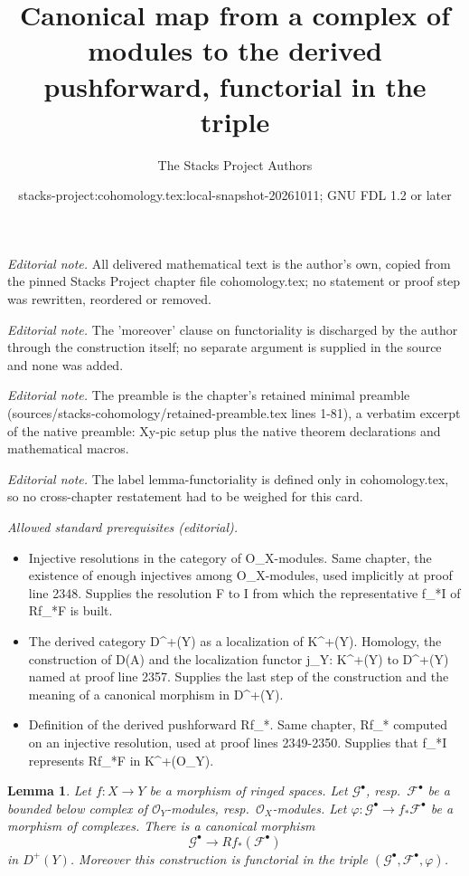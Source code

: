\documentclass[10pt,a4paper]{amsart}
\title{Canonical map from a complex of modules to the derived pushforward, functorial in the triple}
\author{The Stacks Project Authors}
\date{stacks-project:cohomology.tex:local-snapshot-20261011; GNU FDL 1.2 or later}
\theoremstyle{plain}
\newtheorem{lemma}[subsection]{Lemma}
\theoremstyle{definition}
\theoremstyle{remark}
\numberwithin{equation}{subsection}
\begin{document}
\maketitle
\noindent\textit{Editorial note.} All delivered mathematical text is the author's own, copied from the pinned Stacks Project chapter file cohomology.tex; no statement or proof step was rewritten, reordered or removed.\par\medskip
\noindent\textit{Editorial note.} The 'moreover' clause on functoriality is discharged by the author through the construction itself; no separate argument is supplied in the source and none was added.\par\medskip
\noindent\textit{Editorial note.} The preamble is the chapter's retained minimal preamble (sources/stacks-cohomology/retained-preamble.tex lines 1-81), a verbatim excerpt of the native preamble: Xy-pic setup plus the native theorem declarations and mathematical macros.\par\medskip
\noindent\textit{Editorial note.} The label lemma-functoriality is defined only in cohomology.tex, so no cross-chapter restatement had to be weighed for this card.\par\medskip
\noindent\textit{Allowed standard prerequisites (editorial).}\begin{itemize}
\item Injective resolutions in the category of O\_X-modules. Same chapter, the existence of enough injectives among O\_X-modules, used implicitly at proof line 2348. Supplies the resolution F to I from which the representative f\_*I of Rf\_*F is built.
\item The derived category D\textasciicircum{}+(Y) as a localization of K\textasciicircum{}+(Y). Homology, the construction of D(A) and the localization functor j\_Y: K\textasciicircum{}+(Y) to D\textasciicircum{}+(Y) named at proof line 2357. Supplies the last step of the construction and the meaning of a canonical morphism in D\textasciicircum{}+(Y).
\item Definition of the derived pushforward Rf\_*. Same chapter, Rf\_* computed on an injective resolution, used at proof lines 2349-2350. Supplies that f\_*I represents Rf\_*F in K\textasciicircum{}+(O\_Y).
\end{itemize}\medskip
\begin{lemma}
\label{lemma-functoriality}
Let $f : X \to Y$ be a morphism of ringed spaces.
Let $\mathcal{G}^\bullet$, resp.\ $\mathcal{F}^\bullet$ be
a bounded below complex of $\mathcal{O}_Y$-modules,
resp.\ $\mathcal{O}_X$-modules. Let
$\varphi : \mathcal{G}^\bullet \to f_*\mathcal{F}^\bullet$
be a morphism of complexes. There is a canonical morphism
$$
\mathcal{G}^\bullet
\longrightarrow
Rf_*(\mathcal{F}^\bullet)
$$
in $D^{+}(Y)$. Moreover this construction is functorial in the triple
$(\mathcal{G}^\bullet, \mathcal{F}^\bullet, \varphi)$.
\end{lemma}
\end{document}
